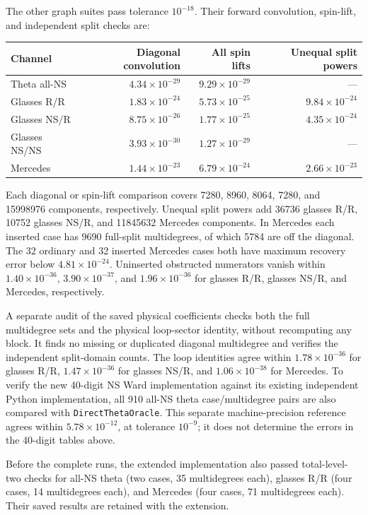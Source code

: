 \documentclass[11pt]{article}
\numberwithin{equation}{section}
\begin{document}
The other graph suites pass tolerance $10^{-18}$. Their forward
convolution, spin-lift, and independent split checks are:
\begin{center}
\small
\begin{tabular}{@{}lrrr@{}}
\toprule
Channel & Diagonal convolution & All spin lifts & Unequal split powers\\
\midrule
Theta all-NS & $4.34\times10^{-29}$ & $9.29\times10^{-29}$ & ---\\
Glasses R/R & $1.83\times10^{-24}$ & $5.73\times10^{-25}$ & $9.84\times10^{-24}$\\
Glasses NS/R & $8.75\times10^{-26}$ & $1.77\times10^{-25}$ & $4.35\times10^{-24}$\\
Glasses NS/NS & $3.93\times10^{-30}$ & $1.27\times10^{-29}$ & ---\\
Mercedes & $1.44\times10^{-23}$ & $6.79\times10^{-24}$ & $2.66\times10^{-23}$\\
\bottomrule
\end{tabular}
\end{center}
Each diagonal or spin-lift comparison covers 7280, 8960, 8064, 7280,
and 15998976 components, respectively. Unequal split powers add 36736
glasses R/R, 10752 glasses NS/R, and 11845632 Mercedes components.
In Mercedes each inserted case has 9690 full-split multidegrees, of which
5784 are off the diagonal. The 32 ordinary and 32 inserted Mercedes cases
both have maximum recovery error below $4.81\times10^{-24}$.
Uninserted obstructed numerators vanish within $1.40\times10^{-36}$,
$3.90\times10^{-37}$, and $1.96\times10^{-36}$ for glasses R/R,
glasses NS/R, and Mercedes, respectively.

A separate audit of the saved physical coefficients checks both the full
multidegree sets and the physical loop-sector identity, without recomputing
any block. It finds no missing or duplicated diagonal multidegree and
verifies the independent split-domain counts. The loop identities agree
within $1.78\times10^{-36}$ for glasses R/R, $1.47\times10^{-36}$ for
glasses NS/R, and $1.06\times10^{-38}$ for Mercedes. To verify the new
40-digit NS Ward implementation against its existing independent Python
implementation, all 910 all-NS theta case/multidegree pairs are also
compared with \texttt{DirectThetaOracle}. This separate machine-precision
reference agrees within $5.78\times10^{-12}$, at tolerance $10^{-9}$;
it does not determine the errors in the 40-digit tables above.

Before the complete runs, the extended implementation also passed
total-level-two checks for all-NS theta (two cases, 35 multidegrees each),
glasses R/R (four cases, 14 multidegrees each), and Mercedes (four cases,
71 multidegrees each). Their saved results are retained with the extension.
\end{document}
